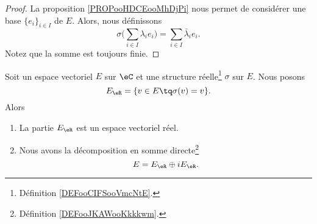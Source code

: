 \begin{proof}
	La proposition \ref{PROPooHDCEooMhDjPi} nous permet de considérer une base \( \{ e_i \}_{i\in I}\) de \( E\). Alors, nous définissons
	\begin{equation}
		\sigma\big( \sum_{i\in I}\lambda_ie_i \big)=\sum_{i\in I}\bar\lambda_ie_i.
	\end{equation}
	Notez que la somme est toujours finie.
\end{proof}

\begin{proposition}     \label{PROPooPZHPooNdarzg}
	Soit un espace vectoriel \( E\) sur \( \eC\) et une structure réelle\footnote{Définition \ref{DEFooCIFSooVmcNtE}.} \( \sigma\) sur \( E\). Nous posons
	\begin{equation}
		E_{\eR}=\{ v\in E\tq \sigma(v)=v \}.
	\end{equation}
	Alors
	\begin{enumerate}
		\item
		      La partie \( E_{\eR}\) est un espace vectoriel réel.
		\item
		      Nous avons la décomposition en somme directe\footnote{Définition \ref{DEFooJKAWooKkkkwm}.}
		      \begin{equation}
			      E=E_{\eR}\oplus iE_{\eR}.
		      \end{equation}
	\end{enumerate}
\end{proposition}

